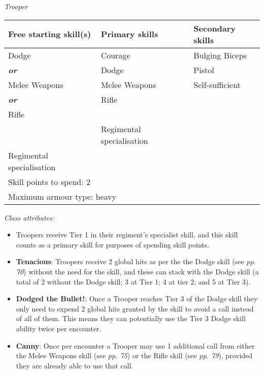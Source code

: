\documentclass{scrbook}
\begin{document}
\textit{Trooper}

\begin{table}
\begin{tabular}{|l|l|l|} \hline 
Free starting skill(s) & Primary skills & Secondary skills \\
 \hline Dodge & Courage & Bulging Biceps \\
 \hline \textbf{\textit{or}} & Dodge & Pistol \\
 \hline Melee Weapons & Melee Weapons & Self-sufficient \\
 \hline \textbf{\textit{or}} & Rifle &  \\
 \hline Rifle &  &  \\
 \hline  & Regimental specialisation &  \\
 \hline Regimental specialisation &  &  \\
 \hline \multicolumn{3}{|l|}{Skill points to spend: 2} \\
 \hline \multicolumn{3}{|l|}{Maximum armour type: heavy} \\
 \hline \end{tabular}

\end{table}

\textit{Class attributes:}

\begin{itemize}
\item Troopers receive Tier 1 in their regiment's specialist skill, and this skill counts as a primary skill for purposes of spending skill points.

\item \textbf{Tenacious}: Troopers receive 2 global hits as per the the Dodge skill (see \textit{pp. 70}) without the need for the skill, and these can stack with the Dodge skill (a total of 2 without the Dodge skill; 3 at Tier 1; 4 at tier 2; and 5 at Tier 3).

\item \textbf{Dodged the Bullet!}: Once a Trooper reaches Tier 3 of the Dodge skill they only need to expend 2 global hits granted by the skill to avoid a call instead of all of them. This means they can potentially use the Tier 3 Dodge skill ability twice per encounter.

\item \textbf{Canny}: Once per encounter a Trooper may use 1 additional call from either the Melee Weapons skill (see \textit{pp. 75}) or the Rifle skill (see \textit{pp. 79}), provided they are already able to use that call.

\end{itemize}
\end{document}
